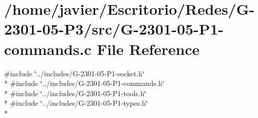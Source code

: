 \hypertarget{_g-2301-05-_p1-commands_8c}{\section{/home/javier/\-Escritorio/\-Redes/\-G-\/2301-\/05-\/\-P3/src/\-G-\/2301-\/05-\/\-P1-\/commands.c File Reference}
\label{_g-2301-05-_p1-commands_8c}
}
{\ttfamily \#include \char`\"{}../includes/\-G-\/2301-\/05-\/\-P1-\/socket.\-h\char`\"{}}\\*
{\ttfamily \#include \char`\"{}../includes/\-G-\/2301-\/05-\/\-P1-\/commands.\-h\char`\"{}}\\*
{\ttfamily \#include \char`\"{}../includes/\-G-\/2301-\/05-\/\-P1-\/tools.\-h\char`\"{}}\\*
{\ttfamily \#include \char`\"{}../includes/\-G-\/2301-\/05-\/\-P1-\/types.\-h\char`\"{}}\\*

